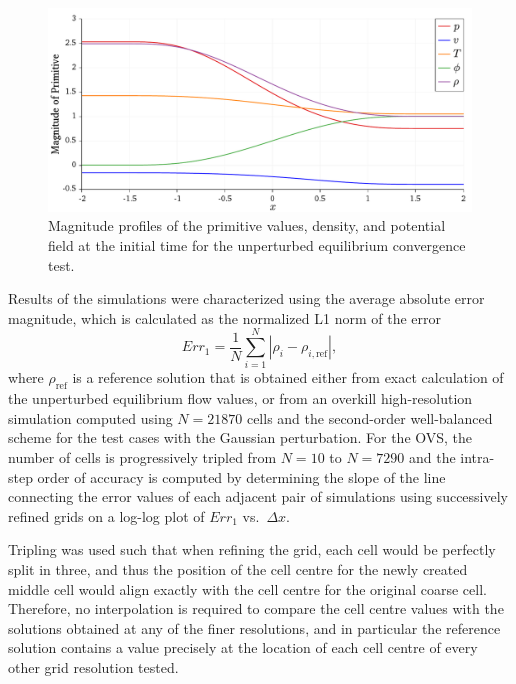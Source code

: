 \begin {figure}
\centering
\includegraphics[width=13cm]{figures/OVS_initial_profile}
\caption {Magnitude profiles of the primitive values, density, and potential field at the initial time for the unperturbed equilibrium convergence test.}
\label{fig:OVS_initial_profile}
\end{figure}

Results of the simulations were characterized using the average absolute error magnitude, which is calculated as the normalized L1 norm of the error
\begin{equation} \label{eq:L1error}
Err_1=\frac{1}{N}\sum\limits_{i=1}^N \left|\rho_i-\rho_{i,\textrm{ref}}\right|,
\end{equation}
where $\rho_{\textrm{ref}}$ is a reference solution that is obtained either from exact calculation of the unperturbed equilibrium flow values, or from an overkill high-resolution simulation computed using $N=21870$ cells and the second-order well-balanced scheme for the test cases with the Gaussian perturbation. For the OVS, the number of cells is progressively tripled from $N=10$ to $N=7290$ and the intra-step order of accuracy is computed by determining the slope of the line connecting the error values of each adjacent pair of simulations using successively refined grids on a log-log plot of $Err_1$ vs.\ $\Delta x$.

Tripling was used such that when refining the grid, each cell would be perfectly split in three, and thus the position of the cell centre for the newly created middle cell would align exactly with the cell centre for the original coarse cell. Therefore, no interpolation is required to compare the cell centre values with the solutions obtained at any of the finer resolutions, and in particular the reference solution contains a value precisely at the location of each cell centre of every other grid resolution tested.

